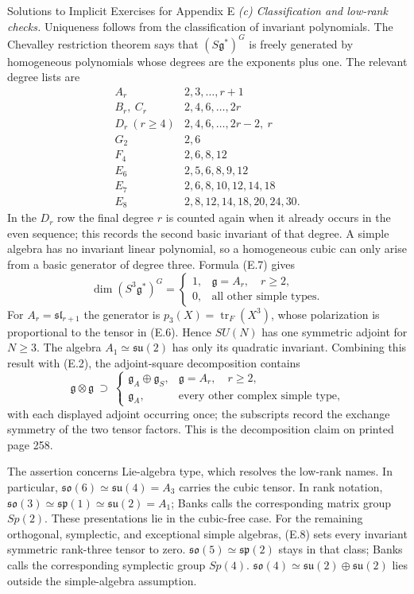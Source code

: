 \begin{bankssolutions}{Solutions to Implicit Exercises for Appendix E}
\medskip\noindent
\textit{(c) Classification and low-rank checks.}
Uniqueness follows from the classification of invariant polynomials.  The
Chevalley restriction theorem says that $(S\mathfrak g^*)^G$ is freely
generated by homogeneous polynomials whose degrees are the exponents plus
one.  The relevant degree lists are
\[
\begin{array}{c|c}
  A_r & 2,3,\ldots,r+1\\
  B_r,\ C_r & 2,4,6,\ldots,2r\\
  D_r\ (r\geq4) & 2,4,6,\ldots,2r-2,\ r\\
  G_2 & 2,6\\
  F_4 & 2,6,8,12\\
  E_6 & 2,5,6,8,9,12\\
  E_7 & 2,6,8,10,12,14,18\\
  E_8 & 2,8,12,14,18,20,24,30.
\end{array}
\tag{E.7}
\]
In the $D_r$ row the final degree $r$ is counted again when it already occurs
in the even sequence; this records the second basic invariant of that degree.
A simple algebra has no invariant linear polynomial, so a homogeneous cubic
can only arise from a basic generator of degree three.  Formula (E.7) gives
\[
  \dim(S^3\mathfrak g^*)^G=
  \begin{cases}
    1,&\mathfrak g=A_r,\quad r\geq2,\\
    0,&\text{all other simple types}.
  \end{cases}
  \tag{E.8}
\]
For $A_r=\mathfrak{sl}_{r+1}$ the generator is
$p_3(X)=\operatorname{tr}_F(X^3)$, whose polarization is proportional to the
tensor in (E.6).  Hence $SU(N)$ has one symmetric adjoint for $N\geq3$.
The algebra $A_1\simeq\mathfrak{su}(2)$ has only its quadratic invariant.
Combining this result with (E.2), the adjoint-square decomposition contains
\[
  \mathfrak g\otimes\mathfrak g\ \supset\
  \begin{cases}
    \mathfrak g_A\oplus\mathfrak g_S,
      &\mathfrak g=A_r,\quad r\geq2,\\
    \mathfrak g_A,
      &\text{every other complex simple type},
  \end{cases}
\]
with each displayed adjoint occurring once; the subscripts record the
exchange symmetry of the two tensor factors.  This is the decomposition
claim on printed page 258.

The assertion concerns Lie-algebra type, which resolves the low-rank names.
In particular,
$\mathfrak{so}(6)\simeq\mathfrak{su}(4)=A_3$ carries the cubic tensor.
In rank notation,
$\mathfrak{so}(3)\simeq\mathfrak{sp}(1)\simeq\mathfrak{su}(2)=A_1$;
Banks calls the corresponding matrix group $Sp(2)$.  These presentations lie
in the cubic-free case.  For the remaining
orthogonal, symplectic, and exceptional simple algebras, (E.8) sets every
invariant symmetric rank-three tensor to zero.
$\mathfrak{so}(5)\simeq\mathfrak{sp}(2)$ stays in that class; Banks calls the
corresponding symplectic group $Sp(4)$.
$\mathfrak{so}(4)\simeq\mathfrak{su}(2)\oplus\mathfrak{su}(2)$ lies outside
the simple-algebra assumption.


\end{bankssolutions}

